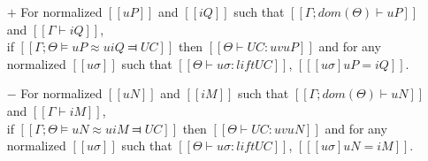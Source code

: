 \begin{lemma} \label{lemma:unification-soundness}
    \hfill
    \begin{itemize}
        \item [$+$] For normalized $[[uP]]$ and $[[iQ]]$ such that 
        $[[Γ ; dom(Θ) ⊢ uP]]$ and $[[Γ ⊢ iQ]]$,\\ 
        if $[[Γ ; Θ ⊨ uP ≈u iQ ⫤ UC]]$ then 
        $[[Θ ⊢ UC : uv uP]]$ and for any normalized $[[uσ]]$ 
        such that $[[ Θ ⊢ uσ : lift UC ]]$, $[[ [uσ]uP = iQ ]]$.

        \item [$-$] For normalized $[[uN]]$ and $[[iM]]$ such that
        $[[Γ ; dom(Θ) ⊢ uN]]$ and $[[Γ ⊢ iM]]$,\\
        if $[[Γ ; Θ ⊨ uN ≈u iM ⫤ UC]]$ then 
        $[[Θ ⊢ UC : uv uN]]$ and for any normalized $[[uσ]]$ such that
        $[[ Θ   ⊢ uσ : lift UC ]]$, $[[ [uσ]uN = iM ]]$.
    \end{itemize}
\end{lemma}
